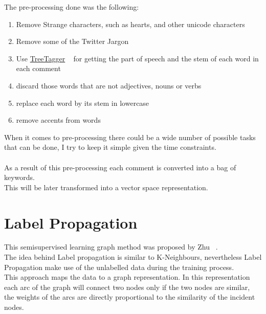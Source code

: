 \documentclass[4pt,a4paper,twocolumn]{article}
\begin{document}
The pre-processing done was the following:
\begin{enumerate}
	\item Remove Strange characters, such as hearts, and other unicode characters
	\item Remove some of the Twitter Jargon 
	\item Use \href{http://www.ims.uni-stuttgart.de/projekte/corplex/TreeTagger/}{TreeTagger} ~\cite{Schmid94probabilisticpart-of-speech} for getting the part of speech and the stem of each word in each comment
	\item discard those words that are not adjectives, nouns or verbs
	\item replace each word by its stem in lowercase
	\item remove accents from words
\end{enumerate}

When it comes to pre-processing there could be a wide number of possible 
tasks that can be done, I try to keep it simple given the time constraints. \\
\\
As a result of this pre-processing each comment is converted into a bag of keywords.\\
This will be later transformed into a vector space representation.




\section{Label Propagation}

This semisupervised learning graph method was proposed by Zhu ~\cite{Zhu:2005:SLG:1104523}.\\
The idea behind Label propagation is similar to K-Neighbours, nevertheless Label Propagation make use of the unlabelled data during the training process.\\

This approach maps the data to a graph representation.
In this representation each arc of the graph will connect two nodes only if the two nodes are similar,
the weights of the arcs are directly proportional to the similarity of the incident nodes.\\
\end{document}
